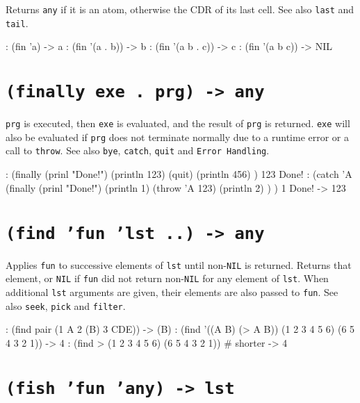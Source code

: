 Returns \texttt{any} if it is an atom, otherwise the CDR of its last cell. See
also \texttt{last} and \texttt{tail}.


\begin{wideverbatim}
: (fin 'a)
-> a
: (fin '(a . b))
-> b
: (fin '(a b . c))
-> c
: (fin '(a b c))
-> NIL
\end{wideverbatim}

 
\section*{\texttt{(finally exe . prg) -> any}}
\label{sec:func-ref-F-(finally exe . prg) -> any}


\texttt{prg} is executed, then \texttt{exe} is evaluated, and the result of \texttt{prg} is
returned. \texttt{exe} will also be evaluated if \texttt{prg} does not terminate
normally due to a runtime error or a call to \texttt{throw}. See also \texttt{bye},
\texttt{catch}, \texttt{quit} and \texttt{Error Handling}.


\begin{wideverbatim}
: (finally (prinl "Done!")
   (println 123)
   (quit)
   (println 456) )
123
Done!
: (catch 'A
   (finally (prinl "Done!")
      (println 1)
      (throw 'A 123)
      (println 2) ) )
1
Done!
-> 123
\end{wideverbatim}

 
\section*{\texttt{(find 'fun 'lst ..) -> any}}
\label{sec:func-ref-F-(find 'fun 'lst ..) -> any}


Applies \texttt{fun} to successive elements of \texttt{lst} until non-\texttt{NIL} is
returned. Returns that element, or \texttt{NIL} if \texttt{fun} did not return
non-\texttt{NIL} for any element of \texttt{lst}. When additional \texttt{lst} arguments are
given, their elements are also passed to \texttt{fun}. See also \texttt{seek}, \texttt{pick}
and \texttt{filter}.


\begin{wideverbatim}
: (find pair (1 A 2 (B) 3 CDE))
-> (B)
: (find '((A B) (> A B)) (1 2 3 4 5 6) (6 5 4 3 2 1))
-> 4
: (find > (1 2 3 4 5 6) (6 5 4 3 2 1))  # shorter
-> 4
\end{wideverbatim}

 
\section*{\texttt{(fish 'fun 'any) -> lst}}
\label{sec:func-ref-F-(fish 'fun 'any) -> lst}


